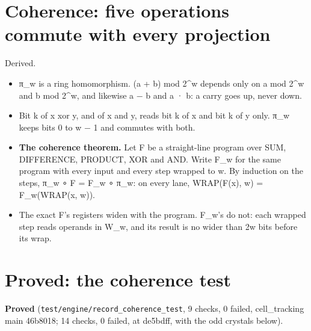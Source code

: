 \section{\texorpdfstring{Coherence: five operations commute with every projection}{Coherence: five operations commute with every projection}}

Derived.

\begin{itemize}
\item π\_\allowbreak{}w is a ring homomorphism. (a + b) mod 2\textasciicircum{}w depends only on a mod 2\textasciicircum{}w and b mod 2\textasciicircum{}w, and likewise a − b and a · b: a carry goes up, never down.
\item Bit k of x xor y, and of x and y, reads bit k of x and bit k of y only. π\_\allowbreak{}w keeps bits 0 to w − 1 and commutes with both.
\item \textbf{The coherence theorem.} Let F be a straight-line program over SUM, DIFFERENCE, PRODUCT, XOR and AND. Write F\_\allowbreak{}w for the same program with every input and every step wrapped to w. By induction on the steps, π\_\allowbreak{}w ∘ F = F\_\allowbreak{}w ∘ π\_\allowbreak{}w: on every lane, WRAP(F(x), w) = F\_\allowbreak{}w(WRAP(x, w)).
\item The exact F's registers widen with the program. F\_\allowbreak{}w's do not: each wrapped step reads operands in W\_\allowbreak{}w, and its result is no wider than 2w bits before its wrap.
\end{itemize}

\section{\texorpdfstring{Proved: the coherence test}{Proved: the coherence test}}

\textbf{Proved} (\texttt{test/\allowbreak{}engine/\allowbreak{}record\_\allowbreak{}coherence\_\allowbreak{}test}, 9 checks, 0 failed, cell\_\allowbreak{}tracking main 46b8018; 14 checks, 0 failed, at de5bdff, with the odd crystals below).

